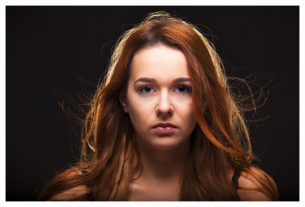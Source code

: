 \documentclass{report}
\begin{document}
\begin{landscape}
  \begin{figure}
    \centering
    \includegraphics[width=\linewidth]{res/port_karolina.jpg}
  \end{figure}
\end{landscape}
\end{document}
